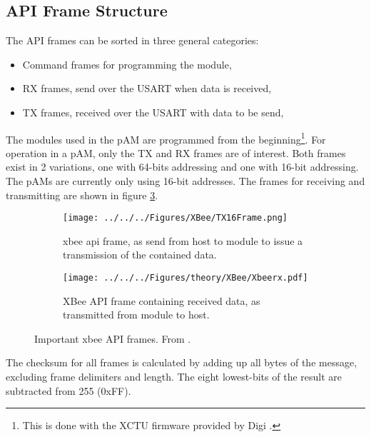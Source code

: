 \subsection{API Frame Structure}
The API frames can be sorted in three general categories:
\begin{itemize}
	\item Command frames for programming the module,
	\item RX frames, send over the USART when data is received,
	\item TX frames, received over the USART with data to be send,
\end{itemize}
The modules used in the \ac{pAM} are programmed from the beginning\footnote{This is done with the XCTU firmware provided by Digi \cite{digi}.}.
For operation in a \ac{pAM}, only the TX and RX frames are of interest. Both frames exist in 2 variations, one with 64-bits addressing and one with 16-bit addressing. The \acp{pAM} are currently only using 16-bit addresses. The frames for receiving and transmitting are shown in figure \ref{fig:xbee:api}.
\begin{figure}\centering
	\begin{subfigure}{\textwidth}
		\centering
		\texttt{[image: ../../../Figures/XBee/TX16Frame.png]}
		\caption{\acs{xbee} \acs{api} frame, as send from host to module to issue a transmission of the contained data.\vspace{1cm}}
		\label{fig:xbee:api:tx}
	\end{subfigure}
	\begin{subfigure}{0.85\textwidth}
	\centering
	\texttt{[image: ../../../Figures/theory/XBee/Xbeerx.pdf]}
	\caption{XBee API frame containing received data, as transmitted from module to host.}
	\label{fig:xbee:api:rx}
\end{subfigure}
 \caption{Important \acs{xbee} API frames. From \cite{xbeemanual}.}
	\label{fig:xbee:api}
\end{figure}

The checksum for all frames is calculated by adding up all bytes of the message, excluding frame delimiters and length. The eight lowest-bits of the result are subtracted from 255 (0xFF).
